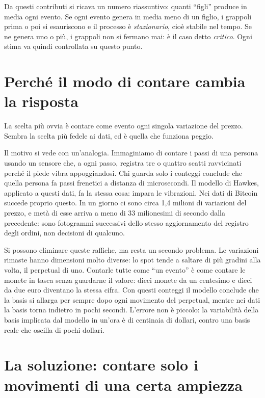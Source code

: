 \documentclass[a4paper,11pt]{article}
\begin{document}
Da questi contributi si ricava un numero riassuntivo: quanti ``figli'' produce in media ogni evento. Se ogni evento genera in media meno di un figlio, i grappoli prima o poi si esauriscono e il processo è \emph{stazionario}, cioè stabile nel tempo. Se ne genera uno o più, i grappoli non si fermano mai: è il caso detto \emph{critico}. Ogni stima va quindi controllata su questo punto.

\section*{Perché il modo di contare cambia la risposta}

La scelta più ovvia è contare come evento ogni singola variazione del prezzo. Sembra la scelta più fedele ai dati, ed è quella che funziona peggio.

Il motivo si vede con un'analogia. Immaginiamo di contare i passi di una persona usando un sensore che, a ogni passo, registra tre o quattro scatti ravvicinati perché il piede vibra appoggiandosi. Chi guarda solo i conteggi conclude che quella persona fa passi frenetici a distanza di microsecondi. Il modello di Hawkes, applicato a questi dati, fa la stessa cosa: impara le vibrazioni. Nei dati di Bitcoin succede proprio questo. In un giorno ci sono circa 1,4 milioni di variazioni del prezzo, e metà di esse arriva a meno di 33 milionesimi di secondo dalla precedente: sono fotogrammi successivi dello stesso aggiornamento del registro degli ordini, non decisioni di qualcuno.

Si possono eliminare queste raffiche, ma resta un secondo problema. Le variazioni rimaste hanno dimensioni molto diverse: lo spot tende a saltare di più gradini alla volta, il perpetual di uno. Contarle tutte come ``un evento'' è come contare le monete in tasca senza guardarne il valore: dieci monete da un centesimo e dieci da due euro diventano la stessa cifra. Con questi conteggi il modello conclude che la basis si allarga per sempre dopo ogni movimento del perpetual, mentre nei dati la basis torna indietro in pochi secondi. L'errore non è piccolo: la variabilità della basis implicata dal modello in un'ora è di centinaia di dollari, contro una basis reale che oscilla di pochi dollari.

\section*{La soluzione: contare solo i movimenti di una certa ampiezza}
\end{document}
